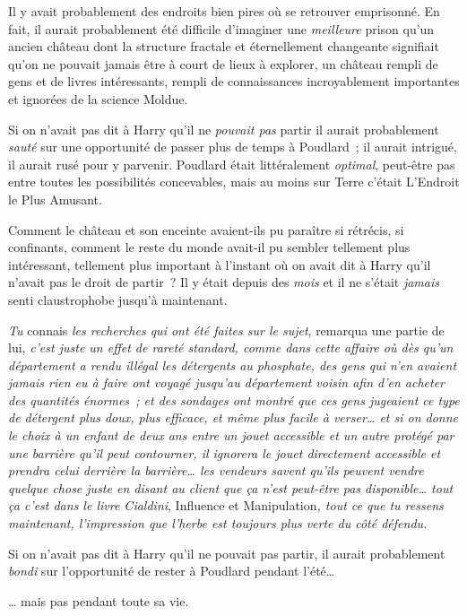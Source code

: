 Il y avait probablement des endroits bien pires où se retrouver emprisonné. En fait, il aurait probablement été difficile d'imaginer une \emph{meilleure} prison qu'un ancien château dont la structure fractale et éternellement changeante signifiait qu'on ne pouvait jamais être à court de lieux à explorer, un château rempli de gens et de livres intéressants, rempli de connaissances incroyablement importantes et ignorées de la science Moldue.

Si on n'avait pas dit à Harry qu'il ne \emph{pouvait pas} partir il aurait probablement \emph{sauté} sur une opportunité de passer plus de temps à Poudlard~; il aurait intrigué, il aurait rusé pour y parvenir. Poudlard était littéralement \emph{optimal}, peut-être pas entre toutes les possibilités concevables, mais au moins sur Terre c'était L'Endroit le Plus Amusant.

Comment le château et son enceinte avaient-ils pu paraître si rétrécis, si confinants, comment le reste du monde avait-il pu sembler tellement plus intéressant, tellement plus important à l'instant où on avait dit à Harry qu'il n'avait pas le droit de partir~? Il y était depuis des \emph{mois} et il ne s'était \emph{jamais} senti claustrophobe jusqu'à maintenant.

\emph{Tu} connais \emph{les recherches qui ont été faites sur le sujet}, remarqua une partie de lui, \emph{c'est juste un effet de rareté standard, comme dans cette affaire où dès qu'un département a rendu illégal les détergents au phosphate, des gens qui n'en avaient jamais rien eu à faire ont voyagé jusqu'au département voisin afin d'en acheter des quantités énormes~; et des sondages ont montré que ces gens jugeaient ce type de détergent plus doux, plus efficace, et même plus facile à verser… et si on donne le choix à un enfant de deux ans entre un jouet accessible et un autre protégé par une barrière qu'il peut contourner, il ignorera le jouet directement accessible et prendra celui derrière la barrière… les vendeurs savent qu'ils peuvent vendre quelque chose juste en disant au client que ça n'est peut-être pas disponible… tout ça c'est dans le livre Cialdini}, Influence et Manipulation\emph{, tout ce que tu ressens maintenant, l'impression que l'herbe est toujours plus verte du côté défendu.}

Si on n'avait pas dit à Harry qu'il ne pouvait pas partir, il aurait probablement \emph{bondi} sur l'opportunité de rester à Poudlard pendant l'été…

… mais pas pendant toute sa vie.


